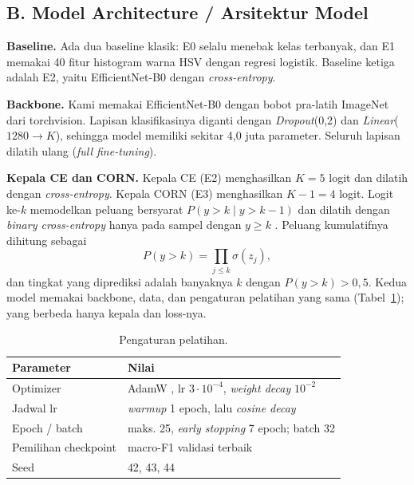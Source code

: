 \documentclass[10pt,a4paper,twocolumn]{article}
\begin{document}
\subsection{B. Model Architecture / Arsitektur Model}
\textbf{Baseline.} Ada dua baseline klasik: E0 selalu menebak kelas terbanyak, dan E1 memakai 40 fitur histogram warna HSV dengan regresi logistik. Baseline ketiga adalah E2, yaitu EfficientNet-B0 dengan \emph{cross-entropy}.

\textbf{Backbone.} Kami memakai EfficientNet-B0 \cite{tan2019} dengan bobot pra-latih ImageNet \cite{deng2009} dari torchvision. Lapisan klasifikasinya diganti dengan \emph{Dropout}(0,2) dan \emph{Linear}($1280 \rightarrow K$), sehingga model memiliki sekitar 4,0 juta parameter. Seluruh lapisan dilatih ulang (\emph{full fine-tuning}).

\textbf{Kepala CE dan CORN.} Kepala CE (E2) menghasilkan $K=5$ logit dan dilatih dengan \emph{cross-entropy}. Kepala CORN (E3) menghasilkan $K-1=4$ logit. Logit ke-$k$ memodelkan peluang bersyarat $P(y>k \mid y>k-1)$ dan dilatih dengan \emph{binary cross-entropy} hanya pada sampel dengan $y \geq k$ \cite{shi2023}. Peluang kumulatifnya dihitung sebagai
\begin{equation}
  P(y>k) = \prod_{j \leq k} \sigma(z_j),
\end{equation}
dan tingkat yang diprediksi adalah banyaknya $k$ dengan $P(y>k) > 0{,}5$. Kedua model memakai backbone, data, dan pengaturan pelatihan yang sama (Tabel~\ref{tab:latih}); yang berbeda hanya kepala dan loss-nya.

\begin{table}[t]
  \centering
  \caption{Pengaturan pelatihan.}
  \label{tab:latih}
  \footnotesize
  \begin{tabular}{|l|p{4.6cm}|}
    \hline
    \textbf{Parameter} & \textbf{Nilai} \\
    \hline
    Optimizer            & AdamW \cite{loshchilov2019}, lr $3\cdot10^{-4}$, \emph{weight decay} $10^{-2}$ \\
    Jadwal lr            & \emph{warmup} 1 epoch, lalu \emph{cosine decay} \\
    Epoch / batch        & maks. 25, \emph{early stopping} 7 epoch; batch 32 \\
    Pemilihan checkpoint & macro-F1 validasi terbaik \\
    Seed                 & 42, 43, 44 \\
    \hline
  \end{tabular}
\end{table}
\end{document}
